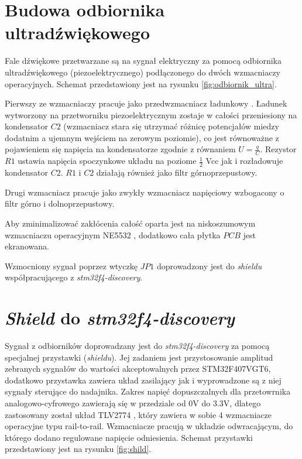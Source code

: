 


\clearpage
\section{Budowa odbiornika ultradźwiękowego}

Fale dźwiękowe przetwarzane są na sygnał elektryczny za pomocą odbiornika ultradźwiękowego (piezoelektrycznego) 
podłączonego do dwóch wzmacniaczy operacyjnych. Schemat przedstawiony jest na rysunku \ref{fig:odbiornik_ultra}.


Pierwszy ze wzmacniaczy pracuje jako przedwzmacniacz ładunkowy \cite{bib:wzm_ladunkowy}.
Ładunek wytworzony na przetworniku piezoelektrycznym zostaje w całości przeniesiony na kondensator $C2$ 
(wzmacniacz stara się utrzymać różnicę potencjałów miedzy dodatnim a ujemnym wejściem na zerowym poziomie),
co jest równoważne z pojawieniem się napięcia na kondensatorze zgodnie z równaniem $U=\frac{q}{C}$.
Rezystor $R1$ ustawia napięcia spoczynkowe układu na poziome $\frac{1}{2}$ Vcc jak i rozładowuje kondensator $C2$.
$R1$ i $C2$ działają również jako filtr górnoprzepustowy.

Drugi wzmacniacz pracuje jako zwykły wzmacniacz napięciowy wzbogacony o filtr górno i dolnoprzepustowy.

Aby zminimalizować zakłócenia całość oparta jest na niskoszumowym wzmacniaczu operacyjnym NE5532 \cite{bib:ne5532}, 
dodatkowo cała płytka $PCB$ jest ekranowana.

Wzmocniony sygnał poprzez wtyczkę $JP1$ doprowadzony jest do \textit{shieldu} współpracującego z \textit{stm32f4-discovery}.

\clearpage

\section{\textit{Shield} do \textit{stm32f4-discovery}}

Sygnał z odbiorników doprowadzany jest do \textit{stm32f4-discovery} za pomocą specjalnej przystawki (\textit{shieldu}).
Jej zadaniem jest przystosowanie amplitud zebranych sygnałów do wartości akceptowalnych przez STM32F407VGT6,
dodatkowo przystawka zawiera układ zasilający jak i wyprowadzone są z niej sygnały sterujące do nadajnika.
Zakres napięć dopuszczalnych dla przetowrnika analogowo-cyfrowego zawierają się w przedziale od 0V do 3.3V,
dlatego zastosowany został układ TLV2774 \cite{bib:TLV2774}, który zawiera w sobie 4 wzmacniacze operacyjne typu
rail-to-rail. Wzmacniacze pracują w układzie odwracającym, do którego dodano regulowane napięcie odniesienia.
Schemat przystawki przedstawiony jest na rysunku \ref{fig:shild}.





